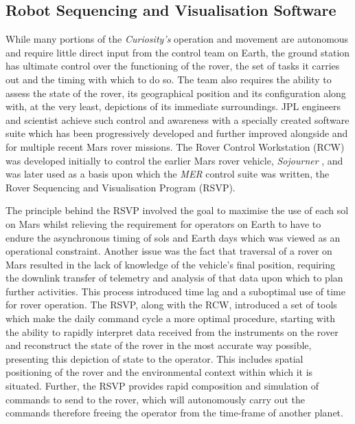     \subsection{Robot Sequencing and Visualisation Software}
      While many portions of the \textit{Curiosity's} operation and movement are autonomous and require little direct input from the control team on Earth, the ground station has ultimate control over the functioning of the rover, the set of tasks it carries out and the timing with which to do so. The team also requires the ability to assess the state of the rover, its geographical position and its configuration along with, at the very least, depictions of its immediate surroundings. JPL engineers and scientist achieve such control and awareness with a specially created software suite which has been progressively developed and further improved alongside and for multiple recent Mars rover missions. The Rover Control Workstation (RCW) was developed initially to control the earlier Mars rover vehicle, \textit{Sojourner} \cite{cooper1998driving}, and was later used as a basis upon which the \textit{MER} control suite was written, the Rover Sequencing and Visualisation Program (RSVP).
      
      The principle behind the RSVP involved the goal to maximise the use of each sol on Mars whilst relieving the requirement for operators on Earth to have to endure the asynchronous timing of sols and Earth days which was viewed as an operational constraint. Another issue was the fact that traversal of a rover on Mars resulted in the lack of knowledge of the vehicle's final position, requiring the downlink transfer of telemetry and analysis of that data upon which to plan further activities. This process introduced time lag and a suboptimal use of time for rover operation. The RSVP, along with the RCW, introduced a set of tools which make the daily command cycle a more optimal procedure, starting with the ability to rapidly interpret data received from the instruments on the rover and reconstruct the state of the rover in the most accurate way possible, presenting this depiction of state to the operator. This includes spatial positioning of the rover and the environmental context within which it is situated. Further, the RSVP provides rapid composition and simulation of commands to send to the rover, which will autonomously carry out the commands therefore freeing the operator from the time-frame of another planet.
      
